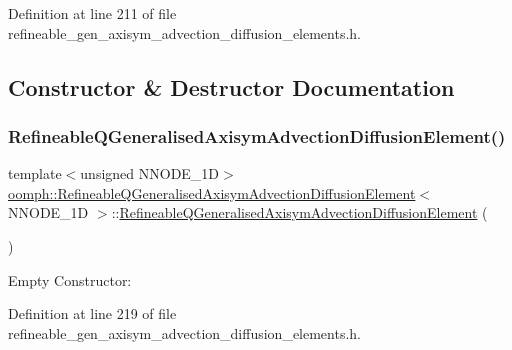 Definition at line 211 of file refineable\+\_\+gen\+\_\+axisym\+\_\+advection\+\_\+diffusion\+\_\+elements.\+h.



\subsection{Constructor \& Destructor Documentation}
\mbox{\label{classoomph_1_1RefineableQGeneralisedAxisymAdvectionDiffusionElement_a8ebab382eeca66418b1ed01625a02805}} 
\subsubsection{\texorpdfstring{Refineable\+Q\+Generalised\+Axisym\+Advection\+Diffusion\+Element()}{RefineableQGeneralisedAxisymAdvectionDiffusionElement()}\hspace{0.1cm}{\footnotesize\ttfamily [1/2]}}
{\footnotesize\ttfamily template$<$unsigned N\+N\+O\+D\+E\+\_\+1D$>$ \\
\hyperlink{classoomph_1_1RefineableQGeneralisedAxisymAdvectionDiffusionElement}{oomph\+::\+Refineable\+Q\+Generalised\+Axisym\+Advection\+Diffusion\+Element}$<$ N\+N\+O\+D\+E\+\_\+1D $>$\+::\hyperlink{classoomph_1_1RefineableQGeneralisedAxisymAdvectionDiffusionElement}{Refineable\+Q\+Generalised\+Axisym\+Advection\+Diffusion\+Element} (\begin{DoxyParamCaption}{ }\end{DoxyParamCaption})\hspace{0.3cm}{\ttfamily [inline]}}



Empty Constructor\+: 



Definition at line 219 of file refineable\+\_\+gen\+\_\+axisym\+\_\+advection\+\_\+diffusion\+\_\+elements.\+h.

